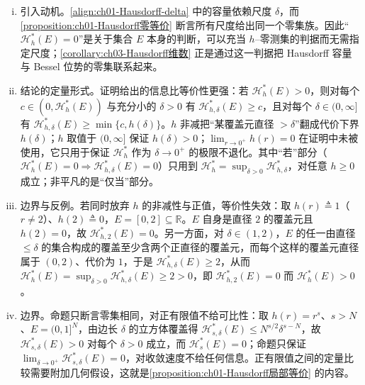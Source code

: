 \documentclass[../../main.tex]{subfiles}%
\begin{document}
\begin{remark}\label{remark:ch01-Hausdorff零等价}
\begin{enumerate}[(i)]
\item 引入动机。\eqref{align:ch01-Hausdorff-delta} 中的容量依赖尺度 $\delta$，而\cref{proposition:ch01-Hausdorff零等价} 断言所有尺度给出同一个零集族。因此“$\mathcal{H}_h^*(E)=0$”是关于集合 $E$ 本身的判断，可以充当 $h$--零测集的判据而无需指定尺度；\cref{corollary:ch03-Hausdorff维数} 正是通过这一判据把 Hausdorff 容量与 Bessel 位势的零集联系起来。
\item 结论的定量形式。证明给出的信息比等价性更强：若 $\mathcal{H}_h^*(E)>0$，则对每个 $c\in(0,\mathcal{H}_h^*(E))$ 与充分小的 $\delta>0$ 有 $\mathcal{H}_{h,\delta}^*(E)\geqslant c$，且对每个 $\delta\in(0,\infty]$ 有 $\mathcal{H}_{h,\delta}^*(E)\geqslant\min\{c,h(\delta)\}$。$h$ 非减把“某覆盖元直径 $>\delta$”翻成代价下界 $h(\delta)$；$h$ 取值于 $(0,\infty]$ 保证 $h(\delta)>0$；$\lim_{r\to0^+}h(r)=0$ 在证明中未被使用，它只用于保证 $\mathcal{H}_h^*$ 作为 $\delta\to0^+$ 的极限不退化。其中“若”部分（$\mathcal{H}_h^*(E)=0\Rightarrow\mathcal{H}_{h,\delta}^*(E)=0$）只用到 $\mathcal{H}_h^*=\sup_{\delta>0}\mathcal{H}_{h,\delta}^*$，对任意 $h\geqslant0$ 成立；非平凡的是“仅当”部分。
\item 边界与反例。若同时放弃 $h$ 的非减性与正值，等价性失效：取 $h(r)\triangleq1$（$r\neq2$）、$h(2)\triangleq0$，$E=[0,2]\subseteq\mathbb{R}$。$E$ 自身是直径 $2$ 的覆盖元且 $h(2)=0$，故 $\mathcal{H}_{h,2}^*(E)=0$。另一方面，对 $\delta\in(1,2)$，$E$ 的任一由直径 $\leqslant\delta$ 的集合构成的覆盖至少含两个正直径的覆盖元，而每个这样的覆盖元直径属于 $(0,2)$、代价为 $1$，于是 $\mathcal{H}_{h,\delta}^*(E)\geqslant2$，从而 $\mathcal{H}_h^*(E)=\sup_{\delta>0}\mathcal{H}_{h,\delta}^*(E)\geqslant2>0$，即 $\mathcal{H}_{h,2}^*(E)=0$ 而 $\mathcal{H}_h^*(E)>0$。
\item 边界。命题只断言零集相同，对正有限值不给可比性：取 $h(r)=r^s$、$s>N$、$E=(0,1]^N$，由边长 $\delta$ 的立方体覆盖得 $\mathcal{H}_{s,\delta}^*(E)\leqslant N^{s/2}\delta^{s-N}$，故 $\mathcal{H}_{s,\delta}^*(E)>0$ 对每个 $\delta>0$ 成立，而 $\mathcal{H}_s^*(E)=0$；命题只保证 $\lim_{\delta\to0^+}\mathcal{H}_{s,\delta}^*(E)=0$，对收敛速度不给任何信息。正有限值之间的定量比较需要附加几何假设，这就是\cref{proposition:ch01-Hausdorff局部等价} 的内容。
\end{enumerate}
\end{remark}
\end{document}
